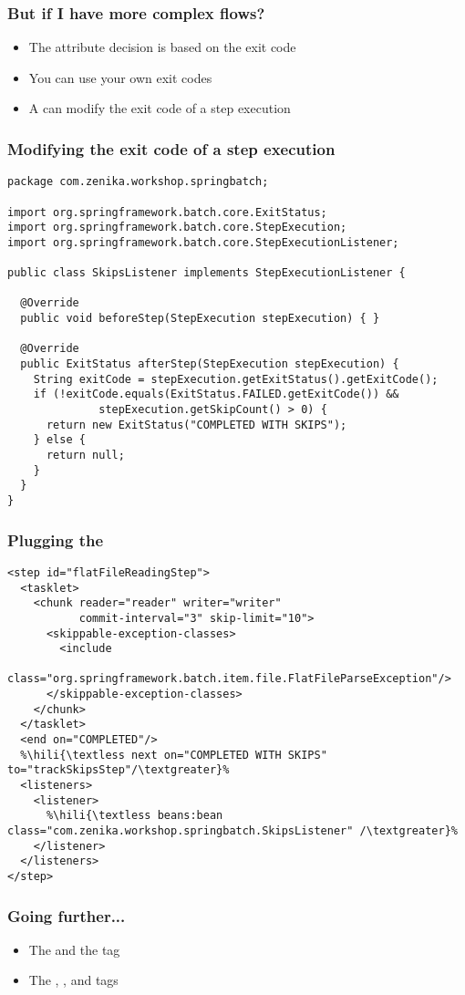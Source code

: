 \begin{frame}
 \frametitle{But if I have more complex flows?}
 \begin{itemize}
  \item The  attribute decision is based on the exit code
  \item You can use your own exit codes
  \item A  can modify the exit code of a step execution
 \end{itemize}

\end{frame}

\begin{frame}[fragile]
 \frametitle{Modifying the exit code of a step execution}
 \lstset{language=Java}
 \begin{lstlisting}
package com.zenika.workshop.springbatch;

import org.springframework.batch.core.ExitStatus;
import org.springframework.batch.core.StepExecution;
import org.springframework.batch.core.StepExecutionListener;

public class SkipsListener implements StepExecutionListener {

  @Override
  public void beforeStep(StepExecution stepExecution) { }

  @Override
  public ExitStatus afterStep(StepExecution stepExecution) {
    String exitCode = stepExecution.getExitStatus().getExitCode();
    if (!exitCode.equals(ExitStatus.FAILED.getExitCode()) && 
              stepExecution.getSkipCount() > 0) {
      return new ExitStatus("COMPLETED WITH SKIPS");
    } else {
      return null;
    }
  }
}
\end{lstlisting}

\end{frame}


\begin{frame}[fragile]
 \frametitle{Plugging the }

\lstset{language=XML}
\begin{lstlisting}
<step id="flatFileReadingStep">
  <tasklet>
    <chunk reader="reader" writer="writer" 
           commit-interval="3" skip-limit="10">
      <skippable-exception-classes>
        <include 
        class="org.springframework.batch.item.file.FlatFileParseException"/>
      </skippable-exception-classes>
    </chunk>
  </tasklet>		
  <end on="COMPLETED"/>	
  %\hili{\textless next on="COMPLETED WITH SKIPS" to="trackSkipsStep"/\textgreater}%
  <listeners>
    <listener>
      %\hili{\textless beans:bean class="com.zenika.workshop.springbatch.SkipsListener" /\textgreater}%
    </listener>
  </listeners>
</step>
\end{lstlisting}

\end{frame}

\begin{frame}
 \frametitle{Going further...}
 \begin{itemize}
  \item The  and the  tag
  \item The , , and  tags
 \end{itemize}
\end{frame}